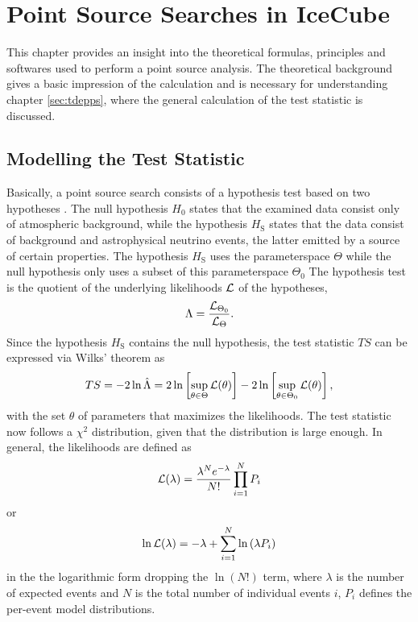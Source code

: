 \chapter{Point Source Searches in IceCube} \label{sec:theory}

This chapter provides an insight into the theoretical formulas, principles and softwares used to perform a point source analysis.
The theoretical background gives a basic impression of the calculation and is necessary for understanding chapter \ref{sec:tdepps}, where the general calculation of the test statistic is discussed.
\section{Modelling the Test Statistic}

Basically, a point source search consists of a hypothesis test based on two hypotheses \cite{likelihood_method}.
The null hypothesis $H_0$ states that the examined data consist only of atmospheric background, while the hypothesis $H_\text{S}$ states that the data consist of background and astrophysical neutrino events, the latter emitted by a source of certain properties.
The hypothesis $H_\text{S}$ uses the parameterspace $\Theta$ while the null hypothesis only uses a subset of this parameterspace $\Theta_0$
The hypothesis test is the quotient of the underlying likelihoods $\mathcal{L}$ of the hypotheses,
\begin{equation}
  \Lambda = \frac{\mathcal{L}_{\Theta_0}}{\mathcal{L}_\Theta}.
\end{equation}
Since the hypothesis $H_\text{S}$ contains the null hypothesis, the test statistic $TS$ can be expressed via Wilks' theorem \cite{wilk} as
\begin{equation}
  TS = -2\ln\hat{\Lambda} = 2\ln\left[ \sup_{\theta\in\Theta}\mathcal{L}(\theta) \right] - 2\ln\left[ \sup_{\theta\in\Theta_0}\mathcal{L}(\theta) \right], \label{eq:TS}
\end{equation}
with the set $\theta$ of parameters that maximizes the likelihoods.
The test statistic now follows a $\chi^2$ distribution, given that the distribution is large enough.
In general, the likelihoods are defined as
\begin{equation}
  \mathcal{L}(\lambda) = \frac{\lambda^Ne^{-\lambda}}{N!}\prod^N_{i=1}P_i
\end{equation}
or
\begin{equation}
  \ln\mathcal{L}(\lambda) = -\lambda + \sum^N_{i=1}\ln{(\lambda P_i)}
\end{equation}
in the the logarithmic form \cite{ex_likelihood} dropping the $\ln(N!)$ term, where $\lambda$ is the number of expected events and $N$ is the total number of individual events $i$, $P_i$ defines the per-event model distributions.
